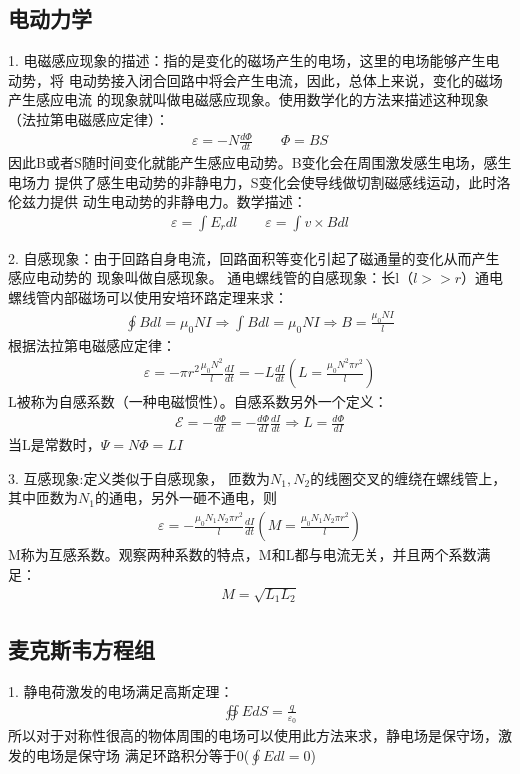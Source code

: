\documentclass[UTF8]{article}
\numberwithin{equation}{section}
\begin{document}
\subsection{电动力学}
1. 电磁感应现象的描述：指的是变化的磁场产生的电场，这里的电场能够产生电动势，将
电动势接入闭合回路中将会产生电流，因此，总体上来说，变化的磁场产生感应电流
的现象就叫做电磁感应现象。使用数学化的方法来描述这种现象（法拉第电磁感应定律）：
\begin{align*}
    \varepsilon=-N\frac{d\Phi}{dt}\qquad \Phi = BS
\end{align*}
因此B或者S随时间变化就能产生感应电动势。B变化会在周围激发感生电场，感生电场力
提供了感生电动势的非静电力，S变化会使导线做切割磁感线运动，此时洛伦兹力提供
动生电动势的非静电力。数学描述：
\begin{align*}
    \varepsilon = \int E_r dl\qquad\varepsilon = \int v\times B dl 
\end{align*}

2. 自感现象：由于回路自身电流，回路面积等变化引起了磁通量的变化从而产生感应电动势的
现象叫做自感现象。
通电螺线管的自感现象：长l（$l>>r$）通电螺线管内部磁场可以使用安培环路定理来求：
\begin{align*}
    \oint B dl = \mu_0 N I \Rightarrow \int B dl =\mu_0 N I\Rightarrow B=\frac{\mu_0NI}{l}
\end{align*}
根据法拉第电磁感应定律：
\begin{align*}
    \varepsilon=-\pi r^2 \frac{\mu_0 N^2}{l}\frac{dI}{dt}=-L\frac{dI}{dt}(L=\frac{\mu_0N^2\pi r^2 }{l})
\end{align*}
L被称为自感系数（一种电磁惯性）。自感系数另外一个定义：
\begin{align*}
    \mathcal{E}=-\frac{d\Phi}{dt}=-\frac{d\Phi}{dI}\frac{dI}{dt}\Rightarrow L=\frac{d\Phi}{dI}
\end{align*}
当L是常数时，$\Psi =N\varPhi = LI$

3. 互感现象:定义类似于自感现象，
匝数为$N_1,N_2$的线圈交叉的缠绕在螺线管上，其中匝数为$N_1$的通电，另外一砸不通电，则
\begin{align*}
    \varepsilon=-\frac{\mu_0 N_1N_2 \pi r^2}{l}\frac{dI}{dt}(M=\frac{\mu_0 N_1N_2 \pi r^2}{l})
\end{align*}
M称为互感系数。观察两种系数的特点，M和L都与电流无关，并且两个系数满足：
\begin{align*}
    M=\sqrt{L_1L_2}
\end{align*}
\subsection{麦克斯韦方程组}
1. 静电荷激发的电场满足高斯定理：
\begin{align*}
    \oiint E dS =\frac{q}{\varepsilon_0} 
\end{align*}
所以对于对称性很高的物体周围的电场可以使用此方法来求，静电场是保守场，激发的电场是保守场
满足环路积分等于0($\oint E dl =0$)
\end{document}

